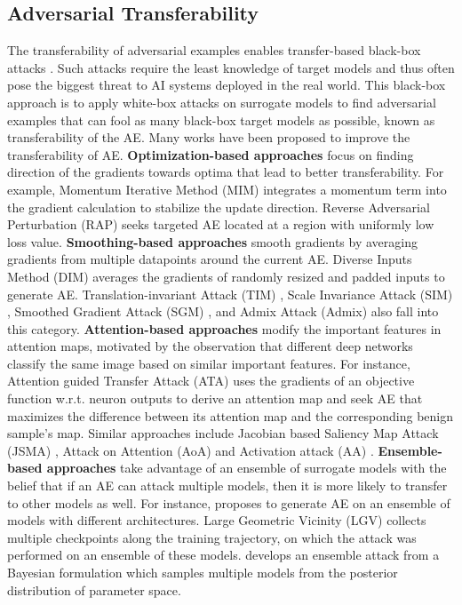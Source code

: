 \documentclass[letterpaper]{article} %
\theoremstyle{plain}
\theoremstyle{definition}
\begin{document}
\subsection {Adversarial Transferability}
The transferability of adversarial examples enables transfer-based black-box attacks \cite{szegedy2014intriguing}. Such attacks require the least knowledge of target models and thus often pose the biggest threat to AI systems deployed in the real world. This black-box approach is to apply white-box attacks on surrogate models to find adversarial examples that can fool as many black-box target models as possible, known as transferability of the AE. Many works have been proposed to improve the transferability of AE. \textbf{Optimization-based approaches} focus on finding direction of the gradients towards optima that lead to better transferability. For example, Momentum Iterative Method (MIM) \cite{dong2018boosting} integrates a momentum term into the gradient calculation to stabilize the update direction. Reverse Adversarial Perturbation (RAP) \cite{qin2022boosting} seeks targeted AE located at a region with uniformly low loss value. \textbf{Smoothing-based approaches} smooth gradients by averaging gradients from multiple datapoints around the current AE. Diverse Inputs Method (DIM) \cite{xie2019improving} averages the gradients of randomly resized and padded inputs to generate AE. Translation-invariant Attack (TIM) \cite{dong2019evading}, Scale Invariance Attack (SIM) \cite{lin2020nesterov}, Smoothed Gradient Attack (SGM) \cite{wu2020towards}, and Admix Attack (Admix) \cite{wang2021admix} also fall into this category. \textbf{Attention-based approaches} modify the important features in attention maps, motivated by the observation that different deep networks classify the same image based on similar important features. For instance, Attention guided Transfer Attack (ATA) \cite{wu2020boosting} uses the gradients of an objective function w.r.t. neuron outputs to derive an attention map and seek AE that maximizes the difference between its attention map and the corresponding benign sample's map. Similar approaches include Jacobian based Saliency Map Attack (JSMA) \cite{papernot2016limitations}, Attack on Attention (AoA) \cite{chen2020universal} and Activation attack (AA) \cite{inkawhich2019feature}. \textbf{Ensemble-based approaches} take advantage of an ensemble of surrogate models with the belief that if an AE can attack multiple models, then it is more likely to transfer to other models as well. For instance, \cite{liu2017delving} proposes to generate AE on an ensemble of models with different architectures. Large Geometric Vicinity (LGV) \cite{gubri2022lgv} collects multiple checkpoints along the training trajectory, on which the  attack was performed on an ensemble of these models. \cite{li2023making} develops an ensemble attack from a Bayesian formulation which samples multiple models from the posterior distribution of parameter space.
 
\end{document}
